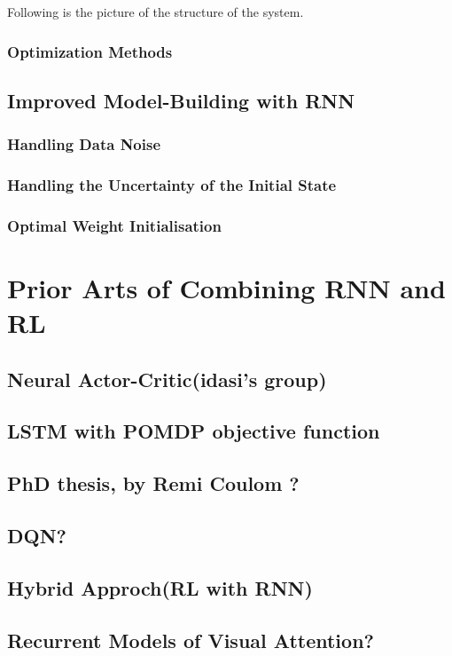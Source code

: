 \documentclass[officiallayout]{tktla}
\begin{document}
Following is the picture of the structure of the system. 

\subsection{Optimization Methods}

\section{Improved Model-Building with RNN} 
\subsection{Handling Data Noise} 
\subsection{Handling the Uncertainty of the Initial State}
\subsection{Optimal Weight Initialisation}

\chapter{Prior Arts of Combining RNN and RL}
\section{Neural Actor-Critic(idasi's group)}
\section{LSTM with POMDP objective function}
\section{PhD thesis, by Remi Coulom ?}

\section{DQN?}
\section{Hybrid Approch(RL with RNN)}
\section{Recurrent Models of Visual Attention?}       
\end{document}
